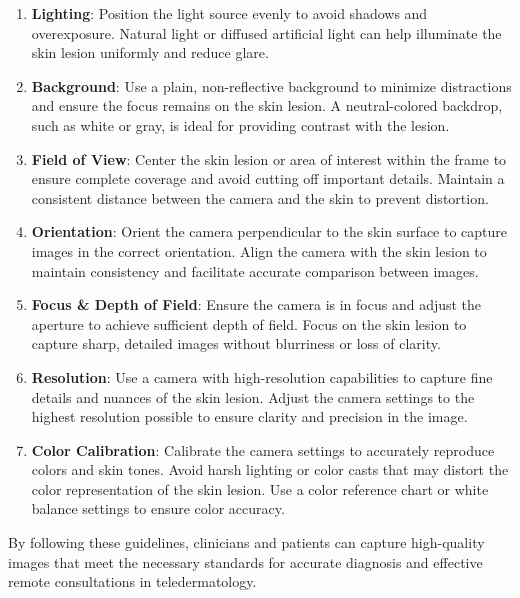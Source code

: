 \begin{enumerate}
    \item \textbf{Lighting}: Position the light source evenly to avoid shadows and overexposure. Natural light or diffused artificial light can help illuminate the skin lesion uniformly and reduce glare.
    \item \textbf{Background}: Use a plain, non-reflective background to minimize distractions and ensure the focus remains on the skin lesion. A neutral-colored backdrop, such as white or gray, is ideal for providing contrast with the lesion.
    \item \textbf{Field of View}: Center the skin lesion or area of interest within the frame to ensure complete coverage and avoid cutting off important details. Maintain a consistent distance between the camera and the skin to prevent distortion.
    \item \textbf{Orientation}: Orient the camera perpendicular to the skin surface to capture images in the correct orientation. Align the camera with the skin lesion to maintain consistency and facilitate accurate comparison between images.
    \item \textbf{Focus \& Depth of Field}: Ensure the camera is in focus and adjust the aperture to achieve sufficient depth of field. Focus on the skin lesion to capture sharp, detailed images without blurriness or loss of clarity.
    \item \textbf{Resolution}: Use a camera with high-resolution capabilities to capture fine details and nuances of the skin lesion. Adjust the camera settings to the highest resolution possible to ensure clarity and precision in the image.
    \item \textbf{Color Calibration}: Calibrate the camera settings to accurately reproduce colors and skin tones. Avoid harsh lighting or color casts that may distort the color representation of the skin lesion. Use a color reference chart or white balance settings to ensure color accuracy.
\end{enumerate}
By following these guidelines, clinicians and patients can capture high-quality images that meet the necessary standards for accurate diagnosis and effective remote consultations in teledermatology.



